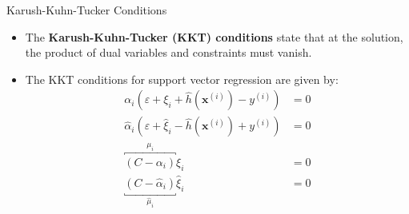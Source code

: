 \begin{dwHeaderFrame}{Karush-Kuhn-Tucker Conditions}
	\begin{itemize}
		\item The \textbf{Karush-Kuhn-Tucker (KKT) conditions} state that at the solution, the product of dual variables and constraints must vanish.
		\item The KKT conditions for support vector regression are given by:
		\begin{align}
			\alpha_i (\varepsilon + \xi_i + \widehat{h}(\bm{x}^{(i)}) - y^{(i)}) 					&= 0
			\label{eq:kkt-1}														\\[2mm]
			\widehat{\alpha}_i (\varepsilon + \widehat{\xi}_i - \widehat{h}(\bm{x}^{(i)}) + y^{(i)}) 	&= 0
			\label{eq:kkt-2}														\\[2mm]
			\overbracket{(C - \alpha_i)}^{\mu_i} \xi_i									&= 0
			\label{eq:kkt-3}														\\[2mm]
			\underbracket{(C - \widehat{\alpha}_i)}_{\widehat{\mu}_i} \widehat{\xi}_i 			&= 0
		\end{align}
	\end{itemize}
	
\end{dwHeaderFrame}


